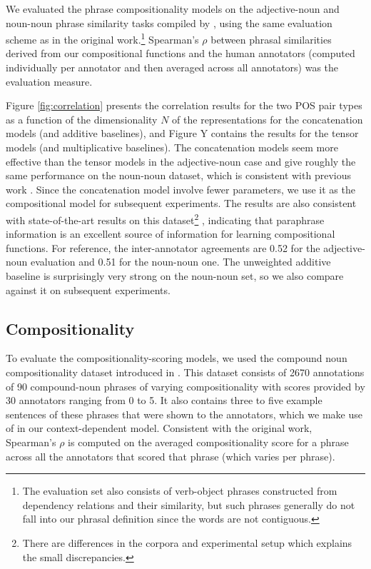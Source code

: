 \documentclass[11pt,letterpaper]{article}
\begin{document}
We evaluated the phrase compositionality models on the adjective-noun and noun-noun phrase similarity tasks compiled by , using the same evaluation scheme as in the original work.\footnote{The evaluation set also consists of verb-object phrases constructed from dependency relations and their similarity, but such phrases generally do not fall into our phrasal definition since the words are not contiguous.}
Spearman's $\rho$ between phrasal similarities derived from our compositional functions and the human annotators (computed individually per annotator and then averaged across all annotators) was the evaluation measure. 

Figure \ref{fig:correlation} presents the correlation results for the two POS pair types as a function of the dimensionality $N$ of the representations for the concatenation models (and additive baselines), and Figure Y contains the results for the tensor models (and multiplicative baselines). 
The concatenation models seem more effective than the tensor models in the adjective-noun case and give roughly the same performance on the noun-noun dataset, which is consistent with previous work \cite{Guevara2011}. 
Since the concatenation model involve fewer parameters, we use it as the compositional model for subsequent experiments. 
The results are also consistent with state-of-the-art results on this dataset\footnote{There are differences in the corpora and experimental setup which explains the small discrepancies.} \cite{Blacoe2012}, indicating that paraphrase information is an excellent source of information for learning compositional functions. 
For reference, the inter-annotator agreements are 0.52 for the adjective-noun evaluation and 0.51 for the noun-noun one. 
The unweighted additive baseline is surprisingly very strong on the noun-noun set, so we also compare against it on subsequent experiments. 

\subsection{Compositionality}
\label{sec:compo-eval}

To evaluate the compositionality-scoring models, we used the compound noun compositionality dataset introduced in .  
This dataset consists of 2670 annotations of 90 compound-noun phrases of varying compositionality with scores provided by 30 annotators ranging from 0 to 5. 
It also contains three to five example sentences of these phrases that were shown to the annotators, which we make use of in our context-dependent model. 
Consistent with the original work, Spearman's $\rho$ is computed on the averaged compositionality score for a phrase across all the annotators that scored that phrase (which varies per phrase). 
\end{document}

